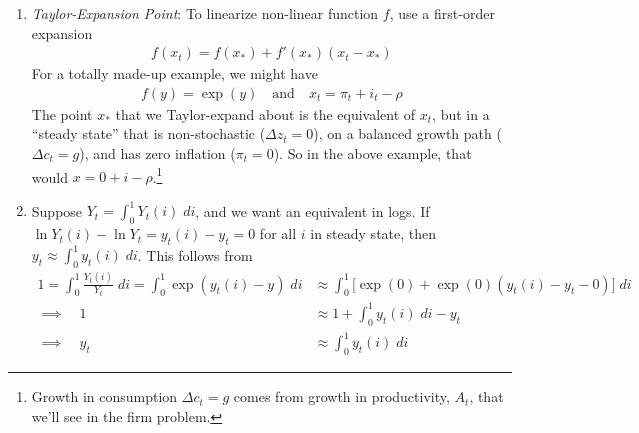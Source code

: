 \documentclass[12pt]{article}
\theoremstyle{plain}
\theoremstyle{definition}
\theoremstyle{remark}
\begin{document}
\begin{enumerate}
  \item \emph{Taylor-Expansion Point}:
    To linearize non-linear function $f$, use a first-order expansion
    \begin{align*}
      f(x_t) = f(x_*) + f'(x_*)(x_t-x_*)
    \end{align*}
    For a totally made-up example, we might have
    \begin{align*}
      f(y)=\exp(y)\quad\text{and}\quad
      x_t = \pi_t + i_t - \rho
    \end{align*}
    The point $x_*$ that we Taylor-expand about is the equivalent of
    $x_t$, but in a ``steady state'' that is non-stochastic
    ($\Delta z_t=0$), on a balanced growth path ($\Delta c_t =g$), and
    has zero inflation ($\pi_t=0$). So in the above example, that would
    $x=0+i-\rho$.\footnote{%
      Growth in consumption $\Delta c_t=g$ comes from growth in
      productivity, $A_t$, that we'll see in the firm problem.
    }

  \item
    Suppose $Y_t=\int_0^1 Y_t(i)\; di$, and we want an equivalent in
    logs. If $\ln Y_t(i) - \ln Y_t = y_t(i)-y_t=0$ for all $i$ in steady
    state, then $y_t \approx \int_0^1 y_t(i)\;di$. This follows from
    \begin{align*}
      1
      = \int_0^1 \frac{Y_t(i)}{Y_t}\; di
      = \int_0^1 \exp(y_t(i)-y)\; di
      &\approx
      \int_0^1 \big[\exp(0) + \exp(0)(y_t(i)-y_t-0)\big]\; di
      \\
      \implies\quad 1
      &\approx 1 + \int_0^1 y_t(i)\; di -y_t
      \\
      \implies\quad y_t
      &\approx \int_0^1 y_t(i)\; di
    \end{align*}
\end{enumerate}
\end{document}
